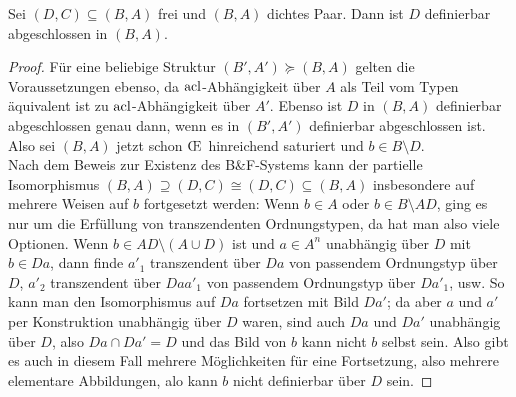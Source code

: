 \begin{lemma}\label{Freie Definierbarkeit}
	Sei $(D,C)\subseteq(B,A)$ frei und $(B,A)$ dichtes Paar. Dann ist $D$ definierbar abgeschlossen in $(B,A)$.
\end{lemma}
\begin{proof}
	Für eine beliebige Struktur $(B',A')\succeq (B,A)$ gelten die Voraussetzungen ebenso, da $\operatorname{acl}$-Abhängigkeit über $A$ als Teil vom Typen äquivalent ist zu $\operatorname{acl}$-Abhängigkeit über $A'$. Ebenso ist $D$ in $(B,A)$ definierbar abgeschlossen genau dann, wenn es in $(B',A')$ definierbar abgeschlossen ist. Also sei $(B,A)$ jetzt schon \OE\ hinreichend saturiert und $b\in B\setminus D$.\\
	Nach dem Beweis zur Existenz des B\&F-Systems kann der partielle Isomorphismus $(B,A)\supseteq(D,C)\cong(D,C)\subseteq(B,A)$ insbesondere auf mehrere Weisen auf $b$ fortgesetzt werden: Wenn $b\in A$ oder $b\in B\setminus AD$, ging es nur um die Erfüllung von transzendenten Ordnungstypen, da hat man also viele Optionen. Wenn $b\in AD\setminus(A\cup D)$ ist und $a\in A^n$ unabhängig über $D$ mit $b\in Da$, dann finde $a'_1$ transzendent über $Da$ von passendem Ordnungstyp über $D$, $a'_2$ transzendent über $Daa'_1$ von passendem Ordnungstyp über $Da'_1$, usw. So kann man den Isomorphismus auf $Da$ fortsetzen mit Bild $Da'$; da aber $a$ und $a'$ per Konstruktion unabhängig über $D$ waren, sind auch $Da$ und $Da'$ unabhängig über $D$, also $Da\cap Da'=D$ und das Bild von $b$ kann nicht $b$ selbst sein. Also gibt es auch in diesem Fall mehrere Möglichkeiten für eine Fortsetzung, also mehrere elementare Abbildungen, alo kann $b$ nicht definierbar über $D$ sein.
\end{proof}
